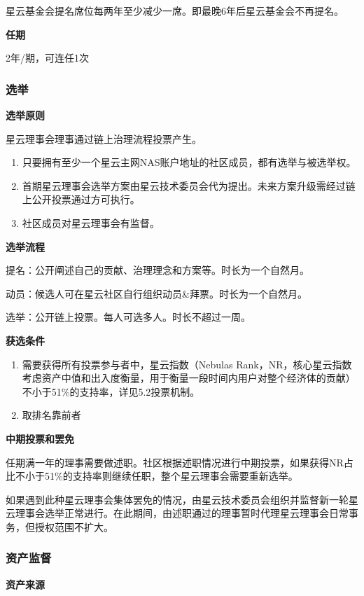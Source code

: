 星云基金会提名席位每两年至少减少一席。即最晚6年后星云基金会不再提名。

\textbf{任期}

2年/期，可连任1次

\subsubsection{选举}
\textbf{选举原则}

星云理事会理事通过链上治理流程投票产生。
\begin{enumerate}
	\item 只要拥有至少一个星云主网NAS账户地址的社区成员，都有选举与被选举权。
	\item 首期星云理事会选举方案由星云技术委员会代为提出。未来方案升级需经过链上公开投票通过方可执行。
	\item 社区成员对星云理事会有监督。
\end{enumerate}
\textbf{选举流程}

提名：公开阐述自己的贡献、治理理念和方案等。时长为一个自然月。

动员：候选人可在星云社区自行组织动员\&拜票。时长为一个自然月。

选举：公开链上投票。每人可选多人。时长不超过一周。

\textbf{获选条件}
\begin{enumerate}
	\item 需要获得所有投票参与者中，星云指数（Nebulas Rank，NR，核心星云指数考虑资产中值和出入度衡量，用于衡量一段时间内用户对整个经济体的贡献）不小于51\%的支持率，详见5.2投票机制。
	\item 取排名靠前者
\end{enumerate}
\textbf{中期投票和罢免}

任期满一年的理事需要做述职。社区根据述职情况进行中期投票，如果获得NR占比不小于51\%的支持率则继续任职，整个星云理事会需要重新选举。

如果遇到此种星云理事会集体罢免的情况，由星云技术委员会组织并监督新一轮星云理事会选举正常进行。在此期间，由述职通过的理事暂时代理星云理事会日常事务，但授权范围不扩大。

\subsubsection{资产监督}
\textbf{资产来源}

